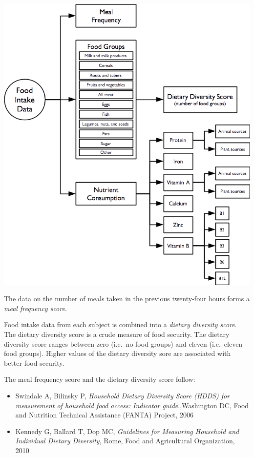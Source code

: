 \documentclass[12pt,a4paper]{book}
\theoremstyle{definition}
\theoremstyle{definition}
\theoremstyle{definition}
\theoremstyle{remark}
\begin{document}
\begin{center}\includegraphics[width=9.76in]{figures/indicators04} \end{center}

The data on the number of meals taken in the previous twenty-four hours
forms a \emph{meal frequency score}.

Food intake data from each subject is combined into a \emph{dietary
diversity score}. The dietary diversity score is a crude measure of food
security. The dietary diversity score ranges between zero (i.e.~no food
groups) and eleven (i.e.~eleven food groups). Higher values of the
dietary diversity sore are associated with better food security.

The meal frequency score and the dietary diversity score follow:

\begin{itemize}
\item
  Swindale A, Bilinsky P, \emph{Household Dietary Diversity Score (HDDS)
  for measurement of household food access: Indicator guide}.,Washington
  DC, Food and Nutrition Technical Assistance (FANTA) Project, 2006
\item
  Kennedy G, Ballard T, Dop MC, \emph{Guidelines for Measuring Household
  and Individual Dietary Diversity}, Rome, Food and Agricultural
  Organization, 2010
\end{itemize}
\end{document}
